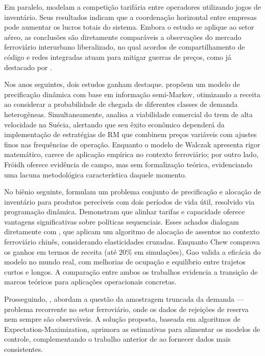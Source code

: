 Em paralelo, \citep{Netessine2005} modelam a competição tarifária entre operadores utilizando jogos de inventário. Seus resultados indicam que a coordenação horizontal entre empresas pode aumentar os lucros totais do sistema. Embora o estudo se aplique ao setor aéreo, as conclusões são diretamente comparáveis a observações do mercado ferroviário interurbano liberalizado, no qual acordos de compartilhamento de código e redes integradas atuam para mitigar guerras de preços, como já destacado por \cite{Ammirato2020}.

Nos anos seguintes, dois estudos ganham destaque. \citep{Walczak2007} propõem um modelo de precificação dinâmica com base em informação semi-Markov, otimizando a receita ao considerar a probabilidade de chegada de diferentes classes de demanda heterogêneas. Simultaneamente, \citep{FROIDH2008268} analisa a viabilidade comercial do trem de alta velocidade na Suécia, alertando que seu êxito econômico dependerá da implementação de estratégias de RM que combinem preços variáveis com ajustes finos nas frequências de operação. Enquanto o modelo de Walczak apresenta rigor matemático, carece de aplicação empírica no contexto ferroviário; por outro lado, Fröidh oferece evidência de campo, mas sem formalização teórica, evidenciando uma lacuna metodológica característica daquele momento.

No biênio seguinte, \citep{CHEW2009} formulam um problema conjunto de precificação e alocação de inventário para produtos perecíveis com dois períodos de vida útil, resolvido via programação dinâmica. Demonstram que alinhar tarifas e capacidade oferece vantagens significativas sobre políticas sequenciais. Esses achados dialogam diretamente com \citep{Gao2010}, que aplicam um algoritmo de alocação de assentos no contexto ferroviário chinês, considerando elasticidades cruzadas. Enquanto Chew comprova os ganhos em termos de receita (até 20\% em simulações), Gao valida a eficácia do modelo no mundo real, com melhorias de ocupação e equilíbrio entre trajetos curtos e longos. A comparação entre ambos os trabalhos evidencia a transição de marcos teóricos para aplicações operacionais concretas.

Prosseguindo, \citep{Guo2012}, abordam a questão da amostragem truncada da demanda — problema recorrente no setor ferroviário, onde os dados de rejeições de reserva nem sempre são observáveis. A solução proposta, baseada em algoritmos de Expectation-Maximization, aprimora as estimativas para alimentar os modelos de controle, complementando o trabalho anterior de \citep{Walczak2007} ao fornecer dados mais consistentes.

